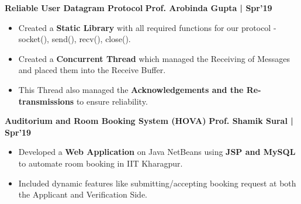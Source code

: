 \documentclass[10pt]{article}
\begin{document}
\vspace{-0.5ex}
\large {\textbf{Reliable User Datagram Protocol}} \normalsize  \href{https://github.com/shmundhra/Socket-Programming/tree/master/My\%20Reliable\%20UDP} {\hspace{0.5ex}\faGithub} {\hfill} \textbf{Prof. Arobinda Gupta | Spr'19}\\[-1.75em]
\begin{itemize}
    \item Created a \textbf{Static Library} with all required functions for our protocol - socket(), send(), recv(), close().\\[-1.9em]
    \item Created a \textbf{Concurrent Thread} which managed the Receiving of Messages and placed them into the Receive Buffer.\\[-1.9em]
    \item This Thread also managed the \textbf{Acknowledgements and the Re-transmissions} to ensure reliability.\\[-1em]
\end{itemize}
\vspace{-0.5ex}
\large {\textbf{Auditorium and Room Booking System (HOVA)}} \normalsize  \href{https://github.com/shmundhra/HOVA} {\hspace{0.5ex}\faGithub} {\hfill} \textbf{Prof. Shamik Sural | Spr'19}\\[-1.75em]
\begin{itemize}
    \item Developed a \textbf{Web Application} on Java NetBeans using \textbf{JSP and MySQL} to automate room booking in IIT Kharagpur.\\[-1.9em]
    \item Included dynamic features like submitting/accepting booking request at both the Applicant and Verification Side.\\[-1em]
\end{itemize}
\end{document}
